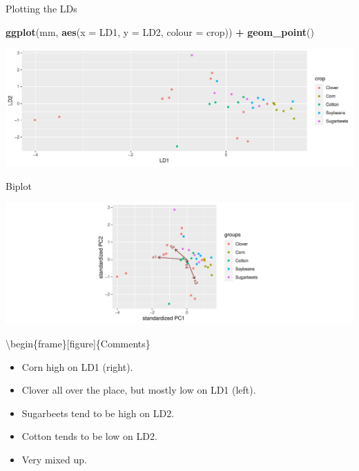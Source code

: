 \documentclass[
  ignorenonframetext,
]{beamer}
\newenvironment{Shaded}{\begin{snugshade}}{\end{snugshade}}
\newcommand{\DataTypeTok}[1]{\textcolor[rgb]{0.13,0.29,0.53}{#1}}
\newcommand{\KeywordTok}[1]{\textcolor[rgb]{0.13,0.29,0.53}{\textbf{#1}}}
\newcommand{\NormalTok}[1]{#1}
\newcommand{\OperatorTok}[1]{\textcolor[rgb]{0.81,0.36,0.00}{\textbf{#1}}}
\newcommand{\StringTok}[1]{\textcolor[rgb]{0.31,0.60,0.02}{#1}}
\begin{document}
\begin{frame}[fragile]{Plotting the LDs}
\protect\hypertarget{plotting-the-lds}{}

\begin{Shaded}
\begin{Highlighting}[]
\KeywordTok{ggplot}\NormalTok{(mm, }\KeywordTok{aes}\NormalTok{(}\DataTypeTok{x =}\NormalTok{ LD1, }\DataTypeTok{y =}\NormalTok{ LD2, }\DataTypeTok{colour =}\NormalTok{ crop)) }\OperatorTok{+}
\StringTok{  }\KeywordTok{geom_point}\NormalTok{()}
\end{Highlighting}
\end{Shaded}

\includegraphics{slides_d29_files/figure-beamer/piacentini-1.pdf}

\end{frame}

\begin{frame}[fragile]{Biplot}
\protect\hypertarget{biplot-1}{}

\begin{Shaded}
\end{Shaded}

\includegraphics{slides_d29_files/figure-beamer/unnamed-chunk-342-1.pdf}

\textbackslash begin\{frame\}{[}figure{]}\{Comments\}

\begin{itemize}
\item
  Corn high on LD1 (right).
\item
  Clover all over the place, but mostly low on LD1 (left).
\item
  Sugarbeets tend to be high on LD2.
\item
  Cotton tends to be low on LD2.
\item
  Very mixed up.
\end{itemize}

\end{frame}
\end{document}
